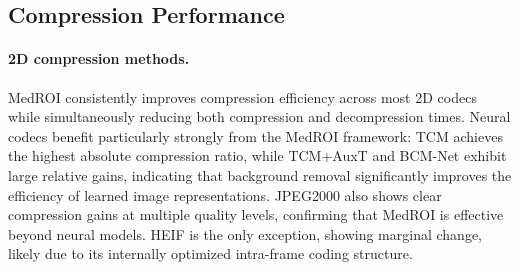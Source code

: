 \documentclass[runningheads]{llncs}
\begin{document}
\subsection{Compression Performance}
\paragraph{2D compression methods.}
MedROI consistently improves compression efficiency across most 2D codecs while simultaneously reducing both compression and decompression times. 
Neural codecs benefit particularly strongly from the MedROI framework: TCM achieves the highest absolute compression ratio, while TCM+AuxT and BCM-Net exhibit large relative gains, indicating that background removal significantly improves the efficiency of learned image representations. 
JPEG2000 also shows clear compression gains at multiple quality levels, confirming that MedROI is effective beyond neural models. 
HEIF is the only exception, showing marginal change, likely due to its internally optimized intra-frame coding structure.
\end{document}
